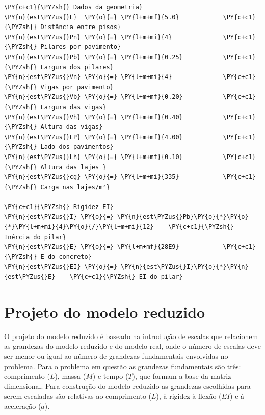     \begin{tcolorbox}[breakable, size=fbox, boxrule=1pt, pad at break*=1mm,colback=cellbackground, colframe=cellborder]
\begin{Verbatim}[commandchars=\\\{\}]
\PY{c+c1}{\PYZsh{} Dados da geometria}
\PY{n}{est\PYZus{}L}  \PY{o}{=} \PY{l+m+mf}{5.0}            \PY{c+c1}{\PYZsh{} Distância entre pisos}
\PY{n}{est\PYZus{}Pn} \PY{o}{=} \PY{l+m+mi}{4}              \PY{c+c1}{\PYZsh{} Pilares por pavimento}
\PY{n}{est\PYZus{}Pb} \PY{o}{=} \PY{l+m+mf}{0.25}           \PY{c+c1}{\PYZsh{} Largura dos pilares}
\PY{n}{est\PYZus{}Vn} \PY{o}{=} \PY{l+m+mi}{4}              \PY{c+c1}{\PYZsh{} Vigas por pavimento}
\PY{n}{est\PYZus{}Vb} \PY{o}{=} \PY{l+m+mf}{0.20}           \PY{c+c1}{\PYZsh{} Largura das vigas}
\PY{n}{est\PYZus{}Vh} \PY{o}{=} \PY{l+m+mf}{0.40}           \PY{c+c1}{\PYZsh{} Altura das vigas}
\PY{n}{est\PYZus{}LP} \PY{o}{=} \PY{l+m+mf}{4.00}           \PY{c+c1}{\PYZsh{} Lado dos pavimentos}
\PY{n}{est\PYZus{}Lh} \PY{o}{=} \PY{l+m+mf}{0.10}           \PY{c+c1}{\PYZsh{} Altura das lajes }
\PY{n}{est\PYZus{}cg} \PY{o}{=} \PY{l+m+mi}{335}            \PY{c+c1}{\PYZsh{} Carga nas lajes/m²}

\PY{c+c1}{\PYZsh{} Rigidez EI}
\PY{n}{est\PYZus{}I} \PY{o}{=} \PY{n}{est\PYZus{}Pb}\PY{o}{*}\PY{o}{*}\PY{l+m+mi}{4}\PY{o}{/}\PY{l+m+mi}{12}    \PY{c+c1}{\PYZsh{} Inércia do pilar}
\PY{n}{est\PYZus{}E} \PY{o}{=} \PY{l+m+mf}{28E9}            \PY{c+c1}{\PYZsh{} E do concreto}
\PY{n}{est\PYZus{}EI} \PY{o}{=} \PY{n}{est\PYZus{}I}\PY{o}{*}\PY{n}{est\PYZus{}E}    \PY{c+c1}{\PYZsh{} EI do pilar}
\end{Verbatim}
\end{tcolorbox}

    \hypertarget{projeto-do-modelo-reduzido}{%
\section{Projeto do modelo reduzido}\label{projeto-do-modelo-reduzido}}

O projeto do modelo reduzido é baseado na introdução de escalas que
relacionem as grandezas do modelo reduzido e do modelo real, onde o
número de escalas deve ser menor ou igual ao número de grandezas
fundamentais envolvidas no problema. Para o problema em questão as
grandezas fundamentais são três: comprimento (\(L\)), massa (\(M\)) e
tempo (\(T\)), que formam a base da matriz dimensional. Para construção
do modelo reduzido as grandezas escolhidas para serem escaladas são
relativas ao comprimento (\(L\)), à rigidez à flexão (\(EI\)) e à
aceleração (\(a\)).

